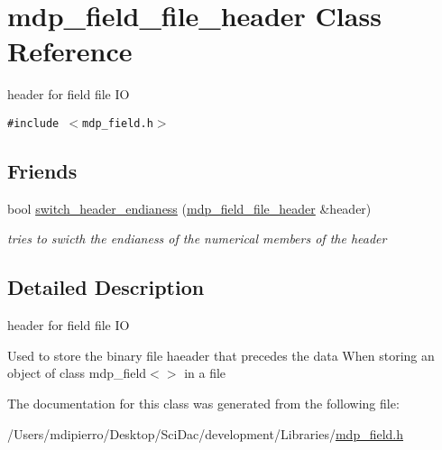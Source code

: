 \hypertarget{classmdp__field__file__header}{
\section{mdp\_\-field\_\-file\_\-header Class Reference}
\label{classmdp__field__file__header}
}
header for field file IO  


{\tt \#include $<$mdp\_\-field.h$>$}

\subsection*{Friends}
\begin{CompactItemize}
\item 
\hypertarget{classmdp__field__file__header_b3818e6c0a7da0722f0157d14ef19e06}{
bool \hyperlink{classmdp__field__file__header_b3818e6c0a7da0722f0157d14ef19e06}{switch\_\-header\_\-endianess} (\hyperlink{classmdp__field__file__header}{mdp\_\-field\_\-file\_\-header} \&header)}
\label{classmdp__field__file__header_b3818e6c0a7da0722f0157d14ef19e06}

\begin{CompactList}\small\item\em tries to swicth the endianess of the numerical members of the header \item\end{CompactList}\end{CompactItemize}


\subsection{Detailed Description}
header for field file IO 

Used to store the binary file haeader that precedes the data When storing an object of class mdp\_\-field$<$$>$ in a file 

The documentation for this class was generated from the following file:\begin{CompactItemize}
\item 
/Users/mdipierro/Desktop/SciDac/development/Libraries/\hyperlink{mdp__field_8h}{mdp\_\-field.h}\end{CompactItemize}
